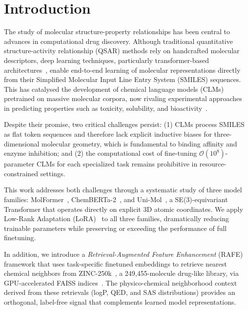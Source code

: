 \documentclass[9pt,twocolumn,conference]{IEEEtran}
\begin{document}
\section{Introduction}
The study of molecular structure-property relationships has been central to advances in computational drug discovery. Although traditional quantitative structure-activity relationship (QSAR) methods rely on handcrafted molecular descriptors, deep learning techniques, particularly transformer-based architectures~\cite{vaswani2017attention}, enable end-to-end learning of molecular representations directly from their Simplified Molecular Input Line Entry System (SMILES) sequences. This has catalysed the development of chemical language models (CLMs) pretrained on massive molecular corpora, now rivaling experimental approaches in predicting properties such as toxicity, solubility, and bioactivity~\cite{ahmad2022chemberta2,huang2020deeppurpose}.

Despite their promise, two critical challenges persist: (1) CLMs process SMILES as flat token sequences and therefore lack explicit inductive biases for three-dimensional molecular geometry, which is fundamental to binding affinity and enzyme inhibition; and (2) the computational cost of fine-tuning $\mathcal{O}(10^8)$-parameter CLMs for each specialized task remains prohibitive in resource-constrained settings.

This work addresses both challenges through a systematic study of three model families: MolFormer~\cite{ross2022molformer}, ChemBERTa-2~\cite{ahmad2022chemberta2}, and Uni-Mol~\cite{zhou2023unimol}, a SE(3)-equivariant Transformer that operates directly on explicit 3D atomic coordinates. We apply Low-Rank Adaptation (LoRA)~\cite{hu2021lora} to all three families, dramatically reducing trainable parameters while preserving or exceeding the performance of full finetuning.

In addition, we introduce a \emph{Retrieval-Augmented Feature Enhancement} (RAFE) framework that uses task-specific finetuned embeddings to retrieve nearest chemical neighbors from ZINC-250k~\cite{gomez2018automatic}, a 249,455-molecule drug-like library, via GPU-accelerated FAISS indices~\cite{johnson2021faiss}. The physico-chemical neighborhood context derived from these retrievals (logP, QED, and SAS distributions) provides an orthogonal, label-free signal that complements learned model representations.
\end{document}
